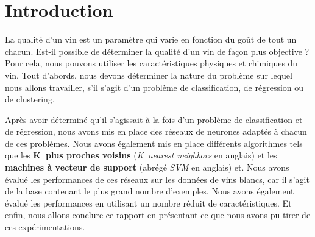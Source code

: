 \chapter{Introduction}
\label{chap:intro}

La qualité d'un vin est un paramètre qui varie en fonction du goût de tout un chacun. Est-il possible de déterminer la qualité
d'un vin de façon plus objective ? Pour cela, nous pouvons utiliser les caractéristiques physiques et chimiques du vin.
Tout d'abords, nous devons déterminer la nature du problème sur lequel nous allons travailler, s'il s'agit d'un problème de
classification, de régression ou de clustering.

Après avoir déterminé qu'il s'agissait à la fois d'un problème de classification et de régression, nous avons mis en place des
réseaux de neurones adaptés à chacun de ces problèmes. Nous avons également mis en place différents algorithmes tels que les
\textbf{K~plus proches voisins} (\textit{K~nearest neighbors} en anglais) et les \textbf{machines à vecteur de support} (abrégé
\textit{SVM} en anglais) et. Nous avons évalué les performances de ces réseaux sur les données de vins blancs, car il s'agit de
la base contenant le plus grand nombre d'exemples. Nous avons également évalué les performances en utilisant un nombre réduit
de caractéristiques. Et enfin, nous allons conclure ce rapport en présentant ce que nous avons pu tirer de ces expérimentations.